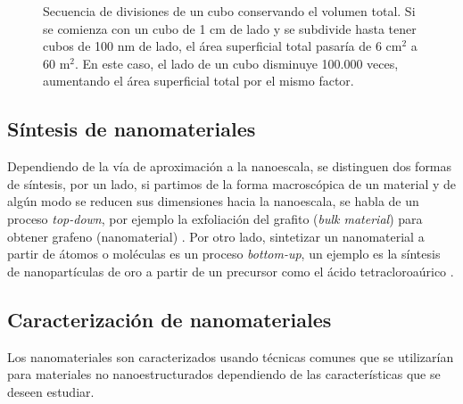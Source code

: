 
\begin{figure}[h!]
	\centering
	
	\caption[Subdivisiones de un cubo demostrando el aumento de área superficial total]{Secuencia de divisiones de un cubo conservando el volumen total. Si se comienza con un cubo de 1 cm de lado y se subdivide hasta tener cubos de 100 nm de lado, el área superficial total pasaría de 6 $\mathrm{cm^2}$ a 60 $\mathrm{m^2}$. En este caso, el lado de un cubo disminuye 100.000 veces, aumentando el área superficial total por el mismo factor.}
	\label{fig:area_cubes}
\end{figure}

\subsection{Síntesis de nanomateriales}
Dependiendo de la vía de aproximación a la nanoescala, se distinguen dos formas de síntesis, por un lado, si partimos de la forma macroscópica de un material y de algún modo se reducen sus dimensiones hacia la nanoescala, se habla de un proceso \textit{top-down}, por ejemplo la exfoliación del grafito (\textit{bulk material}) para obtener grafeno (nanomaterial) \citep{Novoselov2004}.  Por otro lado, sintetizar un nanomaterial a partir de átomos o moléculas es un proceso \textit{bottom-up}, un ejemplo es la síntesis de nanopartículas de oro a partir de un precursor como el ácido tetracloroaúrico \citep{Daniel2004}.

\subsection{Caracterización de nanomateriales}
Los nanomateriales son caracterizados usando técnicas comunes que se utilizarían para materiales no nanoestructurados dependiendo de las características que se deseen estudiar.
